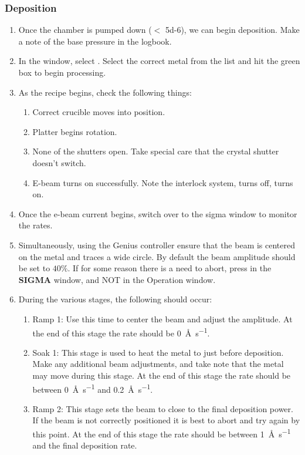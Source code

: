 \subsubsection{Deposition}
\begin{enumerate}[resume]
\item Once the chamber is pumped down ($<$ \SI{5d-6}{\torr}), we can begin deposition. Make a note of the base pressure in the logbook.
\item In the  window, select . Select the correct metal from the list and hit the green box to begin processing.
\item As the recipe begins, check the following things:
\begin{enumerate}
  \item Correct crucible moves into position.
  \item Platter begins rotation.
  \item None of the shutters open. Take special care that the crystal shutter doesn't switch.
  \item E-beam turns on successfully. Note the interlock system,  turns off,  turns on.
\end{enumerate}
\item Once the e-beam current begins, switch over to the sigma window to monitor the rates.
\item Simultaneously, using the Genius controller ensure that the beam is centered on the metal and traces a wide circle. By default the beam amplitude should be set to $40\%$. If for some reason there is a need to abort, press  in the {\bf SIGMA} window, and NOT in the Operation window.
\item During the various stages, the following should occur:
\begin{enumerate}
  \item Ramp 1: Use this time to center the beam and adjust the amplitude. At the end of this stage the rate should be \SI{0}{\angstrom\per\second}.
  \item Soak 1: This stage is used to heat the metal to just before deposition. Make any additional beam adjustments, and take note that the metal may move during this stage. At the end of this stage the rate should be between \SI{0}{\angstrom\per\second} and \SI{0.2}{\angstrom\per\second}.
  \item Ramp 2: This stage sets the beam to close to the final deposition power. If the beam is not correctly positioned it is best to abort and try again by this point. At the end of this stage the rate should be between \SI{1}{\angstrom\per\second} and the final deposition rate.

\end{enumerate}
\end{enumerate}
